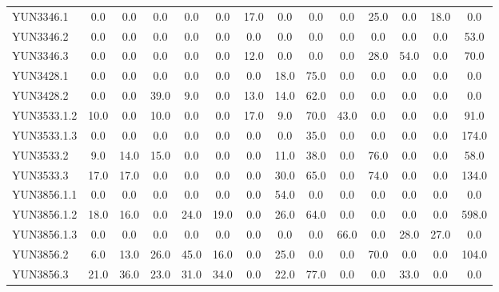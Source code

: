 \documentclass[10pt,a4paper]{article}
\begin{document}
\begin{table}[h]
{\begin{tabular}{|l|*{13}{c|}}
        YUN3346.1 & 0.0 & 0.0 & 0.0 & 0.0 & 0.0 & 17.0 & 0.0 & 0.0 & 0.0 & 25.0 & 0.0 & 18.0 & 0.0 \\
        YUN3346.2 & 0.0 & 0.0 & 0.0 & 0.0 & 0.0 & 0.0 & 0.0 & 0.0 & 0.0 & 0.0 & 0.0 & 0.0 & 53.0 \\
        YUN3346.3 & 0.0 & 0.0 & 0.0 & 0.0 & 0.0 & 12.0 & 0.0 & 0.0 & 0.0 & 28.0 & 54.0 & 0.0 & 70.0 \\
        YUN3428.1 & 0.0 & 0.0 & 0.0 & 0.0 & 0.0 & 0.0 & 18.0 & 75.0 & 0.0 & 0.0 & 0.0 & 0.0 & 0.0 \\
        YUN3428.2 & 0.0 & 0.0 & 39.0 & 9.0 & 0.0 & 13.0 & 14.0 & 62.0 & 0.0 & 0.0 & 0.0 & 0.0 & 0.0 \\
        YUN3533.1.2 & 10.0 & 0.0 & 10.0 & 0.0 & 0.0 & 17.0 & 9.0 & 70.0 & 43.0 & 0.0 & 0.0 & 0.0 & 91.0 \\
        YUN3533.1.3 & 0.0 & 0.0 & 0.0 & 0.0 & 0.0 & 0.0 & 0.0 & 35.0 & 0.0 & 0.0 & 0.0 & 0.0 & 174.0 \\
        YUN3533.2 & 9.0 & 14.0 & 15.0 & 0.0 & 0.0 & 0.0 & 11.0 & 38.0 & 0.0 & 76.0 & 0.0 & 0.0 & 58.0 \\
        YUN3533.3 & 17.0 & 17.0 & 0.0 & 0.0 & 0.0 & 0.0 & 30.0 & 65.0 & 0.0 & 74.0 & 0.0 & 0.0 & 134.0 \\
        YUN3856.1.1 & 0.0 & 0.0 & 0.0 & 0.0 & 0.0 & 0.0 & 54.0 & 0.0 & 0.0 & 0.0 & 0.0 & 0.0 & 0.0 \\
        YUN3856.1.2 & 18.0 & 16.0 & 0.0 & 24.0 & 19.0 & 0.0 & 26.0 & 64.0 & 0.0 & 0.0 & 0.0 & 0.0 & 598.0 \\
        YUN3856.1.3 & 0.0 & 0.0 & 0.0 & 0.0 & 0.0 & 0.0 & 0.0 & 0.0 & 66.0 & 0.0 & 28.0 & 27.0 & 0.0 \\
        YUN3856.2 & 6.0 & 13.0 & 26.0 & 45.0 & 16.0 & 0.0 & 25.0 & 0.0 & 0.0 & 70.0 & 0.0 & 0.0 & 104.0 \\
        YUN3856.3 & 21.0 & 36.0 & 23.0 & 31.0 & 34.0 & 0.0 & 22.0 & 77.0 & 0.0 & 0.0 & 33.0 & 0.0 & 0.0 \\
        \hline
    \end{tabular}
    }
\end{table}
\end{document}
